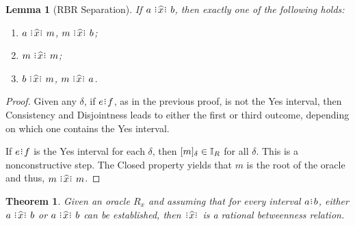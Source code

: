 \documentclass[12pt]{article}
\newtheorem{theorem}{Theorem}[section]
\newtheorem{lemma}{Lemma}[section]
\begin{document}
\begin{lemma}[RBR Separation]\label{os-intsep}
  If $a \xora b$, then exactly one of the following holds:  
  \begin{enumerate}
        \item $a\xora m$, \sout{$m \xora b$};
        \item $m \xora m$; 
        \item $b \xora m$, \sout{$m \xora a$}.
    \end{enumerate}
\end{lemma}

\begin{proof}
Given any $\delta$, if $e\rint f$, as in the previous proof, is not the Yes interval, then Consistency and Disjointness leads to either the first or third outcome, depending on which one contains the Yes interval. 

If $e\rint f$ is the Yes interval for each $\delta$, then $[m]_{\delta} \in \mathbb{I}_R$ for all $\delta$. This is a nonconstructive step. The Closed property yields that $m$ is the root of the oracle and thus, $m \xora m$.
\end{proof}


\begin{theorem}
    Given an oracle $R_x$ and assuming that for every interval $a\rint b$, either $a \xora b$ or \sout{$a \xora b$} can be established, then $\xora$ is a rational betweenness relation. 
\end{theorem}
\end{document}
